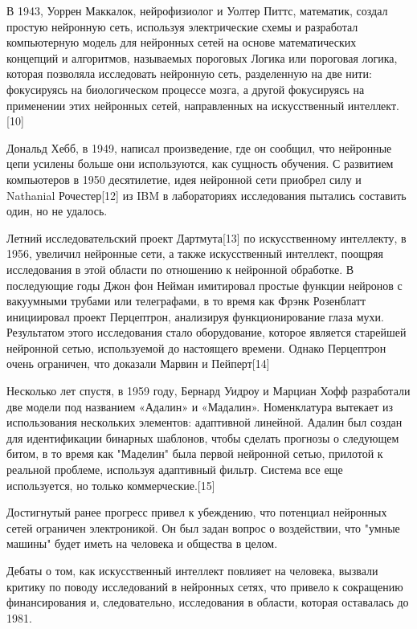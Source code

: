 В 1943, Уоррен Маккалок, нейрофизиолог и Уолтер Питтс, математик, создал простую нейронную сеть, используя электрические схемы и разработал компьютерную модель для нейронных сетей на основе математических концепций и алгоритмов, называемых пороговых Логика или пороговая логика, которая позволяла исследовать нейронную сеть, разделенную на две нити: фокусируясь на биологическом процессе мозга, а другой фокусируясь на применении этих нейронных сетей, направленных на искусственный интеллект.[10]

Дональд Хебб, в 1949, написал произведение, где он сообщил, что нейронные цепи усилены больше они используются, как сущность обучения. С развитием компьютеров в 1950 десятилетие, идея нейронной сети приобрел силу и Nathanial Рочестер[12] из IBM в лабораториях исследования пытались составить один, но не удалось.

Летний исследовательский проект Дартмута[13] по искусственному интеллекту, в 1956, увеличил нейронные сети, а также искусственный интеллект, поощряя исследования в этой области по отношению к нейронной обработке. В последующие годы Джон фон Нейман имитировал простые функции нейронов с вакуумными трубами или телеграфами, в то время как Фрэнк Розенблатт инициировал проект Перцептрон, анализируя функционирование глаза мухи. Результатом этого исследования стало оборудование, которое является старейшей нейронной сетью, используемой до настоящего времени. Однако Перцептрон очень ограничен, что доказали Марвин и Пейперт[14]


Несколько лет спустя, в 1959 году, Бернард Уидроу и Марциан Хофф разработали две модели под названием «Адалин» и «Мадалин». Номенклатура вытекает из использования нескольких элементов: адаптивной линейной. Адалин был создан для идентификации бинарных шаблонов, чтобы сделать прогнозы о следующем битом, в то время как "Маделин" была первой нейронной сетью, прилотой к реальной проблеме, используя адаптивный фильтр. Система все еще используется, но только коммерческие.[15]

Достигнутый ранее прогресс привел к убеждению, что потенциал нейронных сетей ограничен электроникой. Он был задан вопрос о воздействии, что "умные машины" будет иметь на человека и общества в целом.

Дебаты о том, как искусственный интеллект повлияет на человека, вызвали критику по поводу исследований в нейронных сетях, что привело к сокращению финансирования и, следовательно, исследования в области, которая оставалась до 1981.

